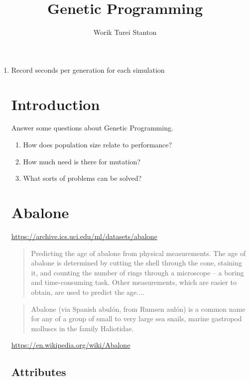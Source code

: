 \documentclass[a4paper,twoside]{article}
\title{Genetic Programming}
\author{Worik Turei Stanton}
\begin{document}
\begin{enumerate}
  \item Record seconds per generation for each simulation
\section{Introduction}

Answer some questions about Genetic Programming.

\begin{enumerate}
\item How does population size relate to performance?
\item How much need is there for mutation?
\item What sorts of problems can be solved?
\end{enumerate}

\section{Abalone}

\url{https://archive.ics.uci.edu/ml/datasets/abalone}

\begin{quote}
  Predicting the age of abalone from physical measurements. The age of
  abalone is determined by cutting the shell through the cone, staining
  it, and counting the number of rings through a microscope -- a boring
  and time-consuming task. Other measurements, which are easier to
  obtain, are used to predict the age....
\end{quote}

\begin{quote}
  Abalone (via Spanish abul\'{o}n, from Rumsen aul\'{o}n) is a common name for
  any of a group of small to very large sea snails, marine gastropod
  molluscs in the family Haliotidae. 
\end{quote}
\url{https://en.wikipedia.org/wiki/Abalone}

\subsection{Attributes}


\end{enumerate}
\end{document}
